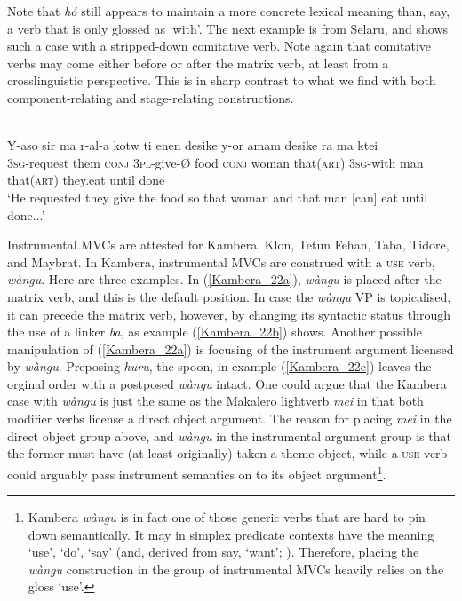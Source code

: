 Note that \textit{hó} still appears to maintain a more concrete lexical meaning than, say, a verb that is only glossed as `with'. The next example is from Selaru, and shows such a case with a stripped-down comitative verb. Note again that comitative verbs may come either before or after the matrix verb, at least from a crosslinguistic perspective. This is in sharp contrast to what we find with both component-relating and stage-relating constructions.

\ea \label{}
\\
\gll Y-aso sir ma r-al-a kotw ti enen desike y-or amam desike ra ma ktei \\
3\textsc{sg}-request them \textsc{conj} 3\textsc{pl}-give-Ø food \textsc{conj} woman that(\textsc{art}) 3\textsc{sg}-with man that(\textsc{art}) they.eat until done \\
\glft `He requested they give the food so that woman and that man [can] eat until done...'\\ 
\z

Instrumental MVCs are attested for Kambera, Klon, Tetun Fehan, Taba, Tidore, and Maybrat. In Kambera, instrumental MVCs are construed with a \textsc{use} verb, \textit{wàngu}. Here are three examples. In (\ref{Kambera_22a}), \textit{wàngu} is placed after the matrix verb, and this is the default position. In case the \textit{wàngu} VP is topicalised, it can precede the matrix verb, however, by changing its syntactic status through the use of a linker \textit{ba}, as example (\ref{Kambera_22b}) shows. Another possible manipulation of (\ref{Kambera_22a}) is focusing of the instrument argument licensed by \textit{wàngu}. Preposing \textit{huru}, the spoon, in example (\ref{Kambera_22c}) leaves the orginal order with a postposed \textit{wàngu} intact. One could argue that the Kambera case with \textit{wàngu} is just the same as the Makalero lightverb \textit{mei} in that both modifier verbs license a direct object argument. The reason for placing \textit{mei} in the direct object group above, and \textit{wàngu} in the instrumental argument group is that the former must have (at least originally) taken a theme object, while a \textsc{use} verb could arguably pass instrument semantics on to its object argument\footnote{Kambera \textit{wàngu} is in fact one of those generic verbs that are hard to pin down semantically. It may in simplex predicate contexts have the meaning `use', `do', `say' (and, derived from say, `want'; \citealt[284ff.]{klamer1998grammar}). Therefore, placing the \textit{wàngu} construction in the group of instrumental MVCs heavily relies on the gloss `use'.}.

